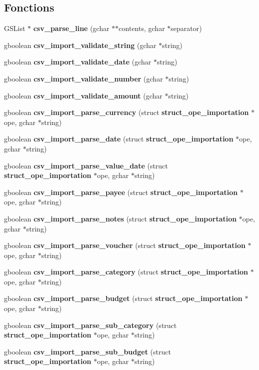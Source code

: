\subsection*{Fonctions}
\begin{DoxyCompactItemize}
\item 
GSList $\ast$ {\bf csv\_\-parse\_\-line} (gchar $\ast$$\ast$contents, gchar $\ast$separator)
\item 
gboolean {\bf csv\_\-import\_\-validate\_\-string} (gchar $\ast$string)
\item 
gboolean {\bf csv\_\-import\_\-validate\_\-date} (gchar $\ast$string)
\item 
gboolean {\bf csv\_\-import\_\-validate\_\-number} (gchar $\ast$string)
\item 
gboolean {\bf csv\_\-import\_\-validate\_\-amount} (gchar $\ast$string)
\item 
gboolean {\bf csv\_\-import\_\-parse\_\-currency} (struct {\bf struct\_\-ope\_\-importation} $\ast$ope, gchar $\ast$string)
\item 
gboolean {\bf csv\_\-import\_\-parse\_\-date} (struct {\bf struct\_\-ope\_\-importation} $\ast$ope, gchar $\ast$string)
\item 
gboolean {\bf csv\_\-import\_\-parse\_\-value\_\-date} (struct {\bf struct\_\-ope\_\-importation} $\ast$ope, gchar $\ast$string)
\item 
gboolean {\bf csv\_\-import\_\-parse\_\-payee} (struct {\bf struct\_\-ope\_\-importation} $\ast$ope, gchar $\ast$string)
\item 
gboolean {\bf csv\_\-import\_\-parse\_\-notes} (struct {\bf struct\_\-ope\_\-importation} $\ast$ope, gchar $\ast$string)
\item 
gboolean {\bf csv\_\-import\_\-parse\_\-voucher} (struct {\bf struct\_\-ope\_\-importation} $\ast$ope, gchar $\ast$string)
\item 
gboolean {\bf csv\_\-import\_\-parse\_\-category} (struct {\bf struct\_\-ope\_\-importation} $\ast$ope, gchar $\ast$string)
\item 
gboolean {\bf csv\_\-import\_\-parse\_\-budget} (struct {\bf struct\_\-ope\_\-importation} $\ast$ope, gchar $\ast$string)
\item 
gboolean {\bf csv\_\-import\_\-parse\_\-sub\_\-category} (struct {\bf struct\_\-ope\_\-importation} $\ast$ope, gchar $\ast$string)
\item 
gboolean {\bf csv\_\-import\_\-parse\_\-sub\_\-budget} (struct {\bf struct\_\-ope\_\-importation} $\ast$ope, gchar $\ast$string)
\item 
$$
\end{DoxyCompactItemize}
